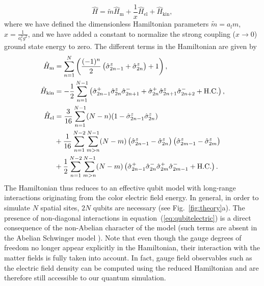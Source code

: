 \documentclass[twocolumn,aps,showpacs,prb,superscriptaddress,floatfix,10pt,nofootinbib]{revtex4-2}
\renewcommand{\eqref}[1]{equation~(\ref{#1})}
\begin{document}
\begin{equation}
\label{eq:hamiltonian}
	\hat{H} = \tilde{m} \hat{H}_{\text{m}} + \frac{1}{x} \hat{H}_{\text{el}} + \hat{H}_{\text{kin}},
\end{equation}
where we have defined the dimensionless Hamiltonian parameters $\tilde{m} = a_l m$, $x = \frac{1}{a_l ^{2}g^{2}}$, and we have added a constant to normalize the strong coupling ($x \rightarrow 0$) ground state energy to zero. The different terms in the Hamiltonian are given by
\begin{align}
	\hat{H}_{\text{m}} &= \sum_{n = 1}^{N} \left(\frac{(-1)^{n}}{2}\left( \hat{\sigma}_{2n-1}^{z}  + \hat{\sigma}_{2n}^{z}\right)+1 \right),\label{eq:qubitmass}\\
	\hat{H}_{\text{kin}} &= -\frac{1}{2}\sum_{n=1}^{N-1}\left( \hat{\sigma}_{2n-1}^{+}\hat{\sigma}_{2n}^{z}\hat{\sigma}_{2n+1}^{-} + \hat{\sigma}_{2n}^{+}\hat{\sigma}_{2n+1}^{z} \hat{\sigma}_{2n+2}^{-} + \text{H.C.}\right),  \label{eq:qubitkinetic}\\
\notag	\hat{H}_{\text{el}}&=\frac{3}{16}\sum_{n=1}^{N-1}(N-n)(1-\hat{\sigma}_{2n-1}^{z}\hat{\sigma}_{2n}^{z})\\  \notag &+\frac{1}{16}\sum_{n=1}^{N-2}\sum_{m>n}^{N-1}(N-m)\left(\hat{\sigma}_{2n-1}^{z}-\hat{\sigma}_{2n}^{z}\right)\left(\hat{\sigma}_{2m-1}^{z}-\hat{\sigma}_{2m}^{z}\right) \\
&+\frac{1}{2}\sum_{n=1}^{N-2}\sum_{m>n}^{N-1}(N-m)\left(\hat{\sigma}_{2n-1}^{+}\hat{\sigma}_{2n}^{-}\hat{\sigma}_{2m}^{+}\hat{\sigma}_{2m-1}^{-}+\mathrm{H.C.}\right). \label{eq:qubitelectric}
\end{align}
The Hamiltonian thus reduces to an effective qubit model with long-range interactions originating from the color electric field energy. In general, in order to simulate $N$ spatial sites, $2N$ qubits are necessary (see Fig.~\ref{fig:theory}a). The presence of non-diagonal interactions in \eqref{eq:qubitelectric} is a direct consequence of the non-Abelian character of the model (such terms are absent in the Abelian Schwinger model \cite{martinez_real-time_2016,kogut_introduction_1979,muschik_u1_2017}). Note that even though the gauge degrees of freedom no longer appear explicitly in the Hamiltonian, their interaction with the matter fields is fully taken into account. In fact, gauge field observables such as the electric field density can be computed using the reduced Hamiltonian \cite{muschik_u1_2017} and are therefore still accessible to our quantum simulation.
\end{document}
